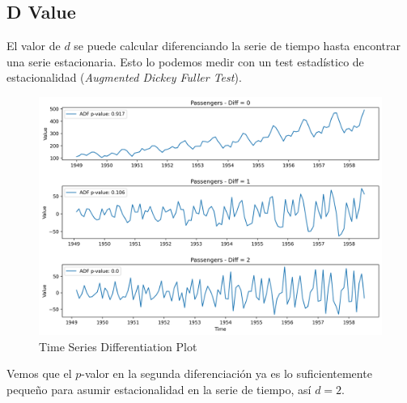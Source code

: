\subsection{D Value}

El valor de $d$ se puede calcular diferenciando la serie de tiempo hasta encontrar una serie estacionaria. Esto lo podemos medir con un test estadístico de estacionalidad (\textit{Augmented Dickey Fuller Test}).

\begin{figure}[H]
    \center
    \includegraphics[scale=0.5]{notebooks/ML/img/time_series_differentiation.png}
    \caption{Time Series Differentiation Plot}
\end{figure}

Vemos que el $p$-valor en la segunda diferenciación ya es lo suficientemente pequeño para asumir estacionalidad en la serie de tiempo, así $d=2$. 


